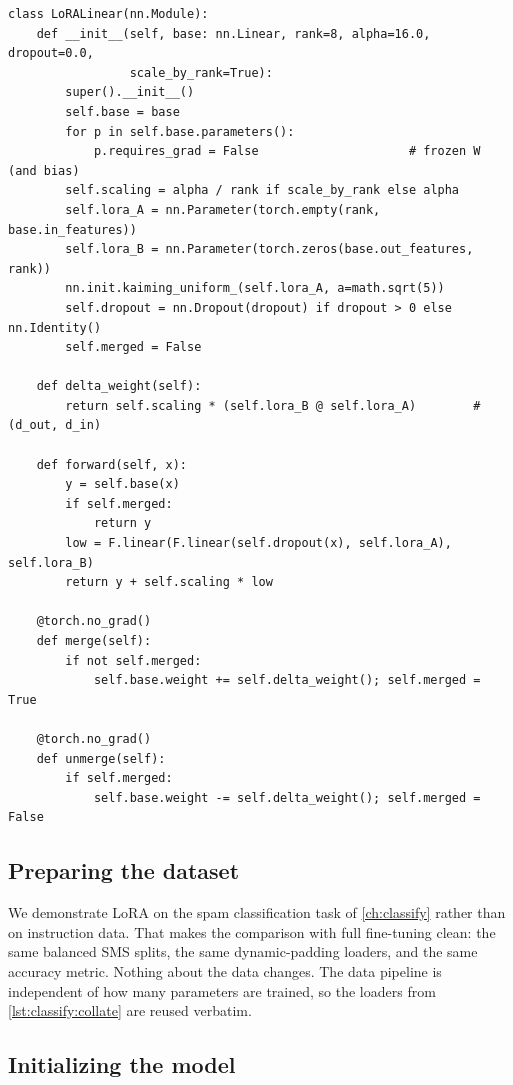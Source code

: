 \begin{lstlisting}[caption={A LoRA linear layer with merge and unmerge (from \ident{llmsys/lora.py}).},label={lst:instruct:loralinear}]
class LoRALinear(nn.Module):
    def __init__(self, base: nn.Linear, rank=8, alpha=16.0, dropout=0.0,
                 scale_by_rank=True):
        super().__init__()
        self.base = base
        for p in self.base.parameters():
            p.requires_grad = False                     # frozen W (and bias)
        self.scaling = alpha / rank if scale_by_rank else alpha
        self.lora_A = nn.Parameter(torch.empty(rank, base.in_features))
        self.lora_B = nn.Parameter(torch.zeros(base.out_features, rank))
        nn.init.kaiming_uniform_(self.lora_A, a=math.sqrt(5))
        self.dropout = nn.Dropout(dropout) if dropout > 0 else nn.Identity()
        self.merged = False

    def delta_weight(self):
        return self.scaling * (self.lora_B @ self.lora_A)        # (d_out, d_in)

    def forward(self, x):
        y = self.base(x)
        if self.merged:
            return y
        low = F.linear(F.linear(self.dropout(x), self.lora_A), self.lora_B)
        return y + self.scaling * low

    @torch.no_grad()
    def merge(self):
        if not self.merged:
            self.base.weight += self.delta_weight(); self.merged = True

    @torch.no_grad()
    def unmerge(self):
        if self.merged:
            self.base.weight -= self.delta_weight(); self.merged = False
\end{lstlisting}

\subsection{Preparing the dataset}

We demonstrate LoRA on the spam classification task of \cref{ch:classify}
rather than on instruction data. That makes the comparison with full fine-tuning clean: the
same balanced SMS splits, the same dynamic-padding loaders, and the same accuracy
metric. Nothing about the data changes. The data pipeline is independent of how many
parameters are trained, so the loaders from \cref{lst:classify:collate} are reused
verbatim.

\subsection{Initializing the model}

